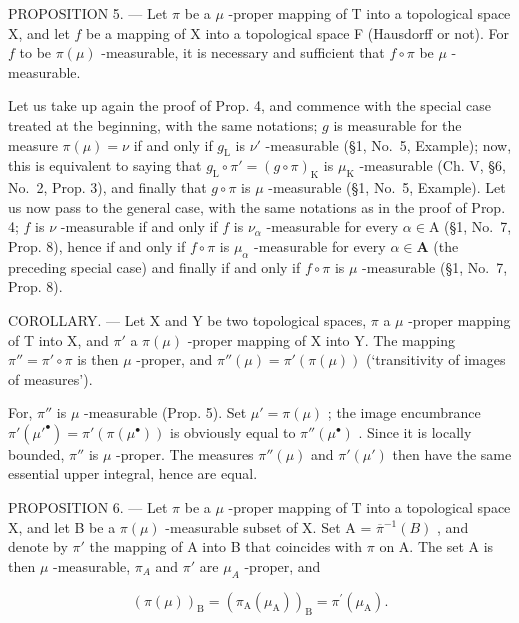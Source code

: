PROPOSITION 5. --- Let \(\pi\) be a \(\mu\) -proper mapping of T into a topological space X, and let \(f\) be a mapping of X into a topological space F (Hausdorff or not). For \(f\) to be \(\pi(\mu)\) -measurable, it is necessary and sufficient that \(f \circ \pi\) be \(\mu\) -measurable.

Let us take up again the proof of Prop. 4, and commence with the special case treated at the beginning, with the same notations; \(g\) is measurable for the measure \(\pi(\mu) = \nu\) if and only if \(g_{\mathrm{L}}\) is \(\nu'\) -measurable (§1, No.~5, Example); now, this is equivalent to saying that \(g_{\mathrm{L}} \circ \pi' = (g \circ \pi)_{\mathrm{K}}\) is \(\mu_{\mathrm{K}}\) -measurable (Ch. V, §6, No.~2, Prop. 3), and finally that \(g \circ \pi\) is \(\mu\) -measurable (§1, No.~5, Example). Let us now pass to the general case, with the same notations as in the proof of Prop. 4; \(f\) is \(\nu\) -measurable if and only if \(f\) is \(\nu_{\alpha}\) -measurable for every \(\alpha \in \mathrm{A}\) (§1, No.~7, Prop. 8), hence if and only if \(f \circ \pi\) is \(\mu_{\alpha}\) -measurable for every \(\alpha \in \mathbf{A}\) (the preceding special case) and finally if and only if \(f \circ \pi\) is \(\mu\) -measurable (§1, No.~7, Prop. 8).

COROLLARY. --- Let X and Y be two topological spaces, \(\pi\) a \(\mu\) -proper mapping of T into X, and \(\pi'\) a \(\pi(\mu)\) -proper mapping of X into Y. The mapping \(\pi'' = \pi' \circ \pi\) is then \(\mu\) -proper, and \(\pi''(\mu) = \pi'(\pi(\mu))\) (`transitivity of images of measures').

For, \(\pi''\) is \(\mu\) -measurable (Prop. 5). Set \(\mu' = \pi(\mu)\) ; the image encumbrance \(\pi'(\mu'^{\bullet}) = \pi'(\pi(\mu^{\bullet}))\) is obviously equal to \(\pi''(\mu^{\bullet})\) . Since it is locally bounded, \(\pi''\) is \(\mu\) -proper. The measures \(\pi''(\mu)\) and \(\pi'(\mu')\) then have the same essential upper integral, hence are equal.

PROPOSITION 6. --- Let \(\pi\) be a \(\mu\) -proper mapping of T into a topological space X, and let B be a \(\pi(\mu)\) -measurable subset of X. Set A = \(\overline{\pi}^{-1}(B)\) , and denote by \(\pi'\) the mapping of A into B that coincides with \(\pi\) on A. The set A is then \(\mu\) -measurable, \(\pi_A\) and \(\pi'\) are \(\mu_A\) -proper, and

\[
\left(\pi (\mu)\right) _ {\mathrm{B}} = \left(\pi_ {\mathrm{A}} (\mu_ {\mathrm{A}})\right) _ {\mathrm{B}} = \pi^ {\prime} (\mu_ {\mathrm{A}}).\tag{2}
\]

